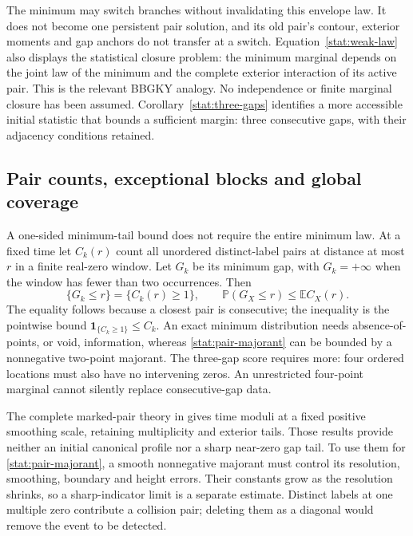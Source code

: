 The minimum may switch branches without invalidating this envelope law.
It does not become one persistent pair solution, and its old pair's
contour, exterior moments and gap anchors do not transfer at a switch.
Equation~\eqref{stat:weak-law} also displays the statistical closure
problem: the minimum marginal depends on the joint law of the minimum
and the complete exterior interaction of its active pair. This is the
relevant BBGKY analogy. No independence or finite marginal closure has
been assumed. Corollary~\ref{stat:three-gaps} identifies a more accessible
initial statistic that bounds a sufficient margin: three consecutive
gaps, with their adjacency conditions retained.

\subsection{Pair counts, exceptional blocks and global coverage}

A one-sided minimum-tail bound does not require the entire minimum law.
At a fixed time let $C_k(r)$ count all unordered distinct-label pairs at
distance at most $r$ in a finite real-zero window. Let $G_k$ be its minimum
gap, with $G_k=+\infty$ when the window has fewer than two occurrences. Then
\begin{equation}
 \{G_k\le r\}=\{C_k(r)\ge1\},\qquad
 \mathbb P(G_X\le r)\le\mathbb E C_X(r).
 \label{stat:pair-majorant}
\end{equation}
The equality follows because a closest pair is consecutive; the inequality
is the pointwise bound $\mathbf1_{\{C_k\ge1\}}\le C_k$.
An exact minimum distribution needs absence-of-points, or void,
information, whereas \eqref{stat:pair-majorant} can be bounded by a
nonnegative two-point majorant. The three-gap score requires more:
four ordered locations must also have no intervening zeros. An
unrestricted four-point marginal cannot silently replace consecutive-gap
data.

The complete marked-pair theory in \cite{BakerOC17,BakerOCReview} gives
time moduli at a fixed positive smoothing scale, retaining multiplicity
and exterior tails. Those results provide neither an initial canonical
profile nor a sharp near-zero gap tail. To use them for
\eqref{stat:pair-majorant}, a smooth nonnegative majorant must control its
resolution, smoothing, boundary and height errors. Their constants grow
as the resolution shrinks, so a sharp-indicator limit is a separate
estimate. Distinct labels at one multiple zero contribute a collision
pair; deleting them as a diagonal would remove the event to be detected.

